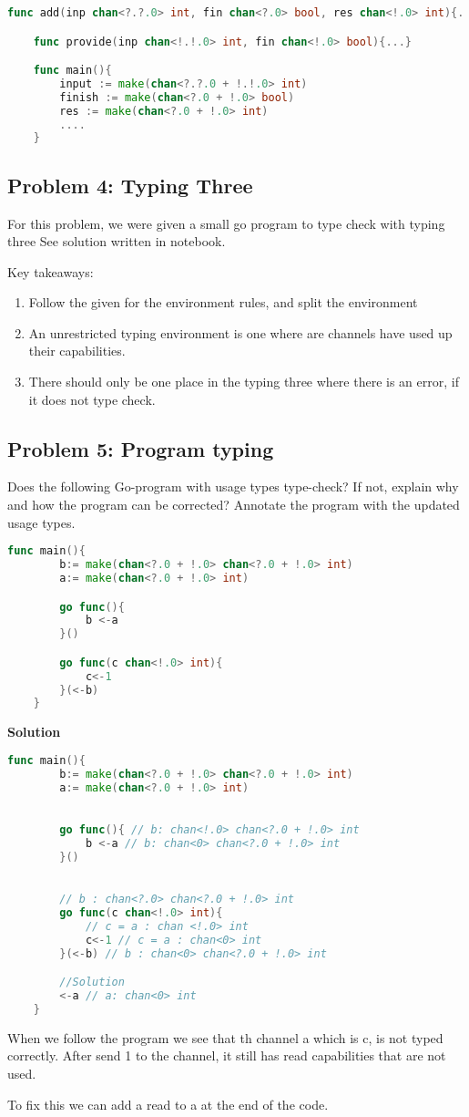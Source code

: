 \begin{lstlisting}[language=go]
    func add(inp chan<?.?.0> int, fin chan<?.0> bool, res chan<!.0> int){...}

    func provide(inp chan<!.!.0> int, fin chan<!.0> bool){...}

    func main(){
        input := make(chan<?.?.0 + !.!.0> int)
        finish := make(chan<?.0 + !.0> bool)
        res := make(chan<?.0 + !.0> int)
        ....
    }
\end{lstlisting}


\subsection{Problem 4: Typing Three}

For this problem, we were given a small go program to type check with typing three
See solution written in notebook.

Key takeaways: 
\begin{enumerate}
    \item Follow the given for the environment rules, and split the environment
    \item An unrestricted typing environment is one where are channels have used up their capabilities. 
    \item There should only be one place in the typing three where there is an error, if it does not type check. 
\end{enumerate}


\subsection{Problem 5: Program typing}

Does the following Go-program with usage types type-check? If not, explain why
and how the program can be corrected? Annotate the program with the updated usage types.

\begin{lstlisting}[language=go]
    func main(){
        b:= make(chan<?.0 + !.0> chan<?.0 + !.0> int)
        a:= make(chan<?.0 + !.0> int)

        go func(){
            b <-a
        }()

        go func(c chan<!.0> int){
            c<-1
        }(<-b)
    }
\end{lstlisting}

\textbf{Solution}

\begin{lstlisting}[language=go]
    func main(){
        b:= make(chan<?.0 + !.0> chan<?.0 + !.0> int)
        a:= make(chan<?.0 + !.0> int)

        
        go func(){ // b: chan<!.0> chan<?.0 + !.0> int
            b <-a // b: chan<0> chan<?.0 + !.0> int
        }()

        
        // b : chan<?.0> chan<?.0 + !.0> int
        go func(c chan<!.0> int){ 
            // c = a : chan <!.0> int 
            c<-1 // c = a : chan<0> int
        }(<-b) // b : chan<0> chan<?.0 + !.0> int

        //Solution
        <-a // a: chan<0> int 
    }
\end{lstlisting}

When we follow the program we see that th channel a which is c, is not typed correctly. 
After send 1 to the channel, it still has read capabilities that are not used. 

To fix this we can add a read to a at the end of the code. 

